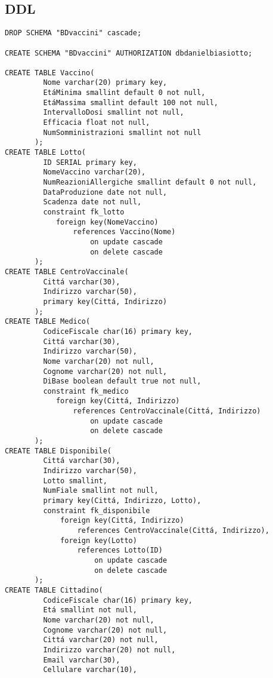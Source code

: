 \documentclass[11pt]{article}
\begin{document}
\subsection{DDL}
\label{sec:orgeb33f87}
\lstset{language=SQL,label= ,caption= ,captionpos=b,numbers=none}
\begin{lstlisting}
DROP SCHEMA "BDvaccini" cascade;

CREATE SCHEMA "BDvaccini" AUTHORIZATION dbdanielbiasiotto;

CREATE TABLE Vaccino(
         Nome varchar(20) primary key,
         EtáMinima smallint default 0 not null,
         EtáMassima smallint default 100 not null,
         IntervalloDosi smallint not null,
         Efficacia float not null,
         NumSomministrazioni smallint not null
       );
CREATE TABLE Lotto(
         ID SERIAL primary key,
         NomeVaccino varchar(20),
         NumReazioniAllergiche smallint default 0 not null,
         DataProduzione date not null,
         Scadenza date not null,
         constraint fk_lotto
            foreign key(NomeVaccino)
                references Vaccino(Nome)
                    on update cascade
                    on delete cascade
       );
CREATE TABLE CentroVaccinale(
         Cittá varchar(30),
         Indirizzo varchar(50),
         primary key(Cittá, Indirizzo)
       );
CREATE TABLE Medico(
         CodiceFiscale char(16) primary key,
         Cittá varchar(30),
         Indirizzo varchar(50),
         Nome varchar(20) not null,
         Cognome varchar(20) not null,
         DiBase boolean default true not null,
         constraint fk_medico
            foreign key(Cittá, Indirizzo)
                references CentroVaccinale(Cittá, Indirizzo)
                    on update cascade
                    on delete cascade
       );
CREATE TABLE Disponibile(
         Cittá varchar(30),
         Indirizzo varchar(50),
         Lotto smallint,
         NumFiale smallint not null,
         primary key(Cittá, Indirizzo, Lotto),
         constraint fk_disponibile
             foreign key(Cittá, Indirizzo)
                 references CentroVaccinale(Cittá, Indirizzo),
             foreign key(Lotto)
                 references Lotto(ID)
                     on update cascade
                     on delete cascade
       );
CREATE TABLE Cittadino(
         CodiceFiscale char(16) primary key,
         Etá smallint not null,
         Nome varchar(20) not null,
         Cognome varchar(20) not null,
         Cittá varchar(20) not null,
         Indirizzo varchar(20) not null,
         Email varchar(30),
         Cellulare varchar(10),

\end{lstlisting}
\end{document}
